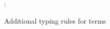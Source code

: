 \begin{figure}
\flushleft {}
\begin{smathpar}
{
   \Gamma \vdash \exLambda{\sigma}: 
}
\end{smathpar}
\caption{Additional typing rules for terms}
\end{figure}
